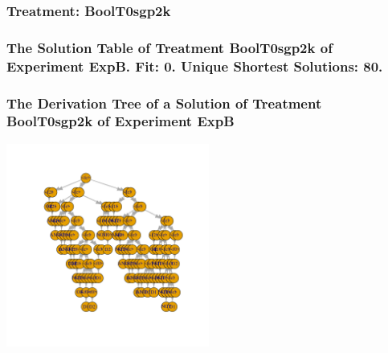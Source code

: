 \documentclass[18pt,c]{beamer}
\begin{document}
 \begin{frame}
 \fontsize{8pt}{9pt}\selectfont
 \frametitle{ Treatment: BoolT0sgp2k }

 \label{ExpBStatsTable007.tex}  
 \end{frame}

 \begin{frame}
 \fontsize{8pt}{9pt}\selectfont
 \frametitle{ The Solution Table of Treatment BoolT0sgp2k of Experiment ExpB. Fit: 0. Unique Shortest Solutions: 80. }

 \label{ExpBSolutionTable000.tex}  
 \end{frame}

 \begin{frame}
 \frametitle{ The Derivation Tree of a Solution of Treatment BoolT0sgp2k of Experiment ExpB }
 \begin{center}
\includegraphics[width=0.5\textwidth, angle=0]
{ExpBDerivationTreeFigure000.pdf}
 \end{center}
 \label{report/ExpBDerivationTreeFigure000.pdf}  
 \end{frame}
\end{document}
